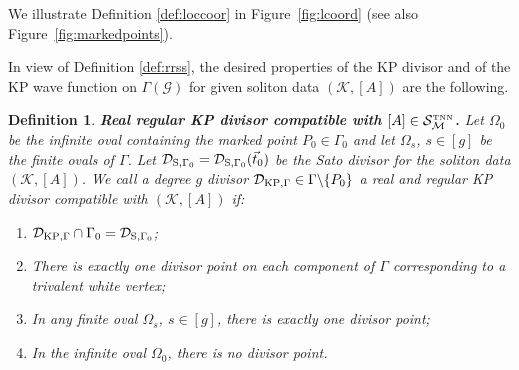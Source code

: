 \documentclass[11pt]{amsart}
\theoremstyle{plain}
\numberwithin{equation}{section}
\newtheorem{definition}{Definition}[subsection]
\def \DKP {{\mathcal D}_{\textup{\scriptsize KP},\Gamma}}
\def \DS {{\mathcal D}_{\textup{\scriptsize S},\Gamma_0}}
\begin{document}
We illustrate Definition \ref{def:loccoor} in Figure~\ref{fig:lcoord} (see also Figure~\ref{fig:markedpoints}).

In view of Definition \ref{def:rrss}, the desired properties of the KP divisor and of the KP wave function on $\Gamma(\mathcal G)$ for given soliton data $(\mathcal K, [A])$ are the following.

\begin{definition}\label{def:real_KP_div}\textbf{Real regular KP divisor compatible with $[A] \in {\mathcal S}_{\mathcal M}^{\mbox{\tiny TNN}}$.}  
Let $\Omega_0$ be the infinite oval containing the marked point $P_0\in\Gamma_0$ and let $\Omega_s$, $s\in[g]$ be the finite ovals of $\Gamma$. Let $\DS=\DS (\vec t_0)$ be the Sato divisor for the soliton data $(\mathcal K, [A])$.
We call a degree $g$ divisor $\DKP\in\Gamma\backslash \{ P_0\}$ a real and 
regular KP divisor compatible with $(\mathcal K, [A])$ if:
\begin{enumerate}
\item $\DKP\cap \Gamma_0 = \DS$; 
\item There is exactly one divisor point on each component of $\Gamma$ corresponding to a trivalent white vertex; 
\item\label{item:defodd_KP} In any finite oval $\Omega_s$, $s\in [g]$, there is exactly one divisor point;
\item\label{item:defeven_KP} In the infinite oval $\Omega_0$, there is no divisor point.
\end{enumerate}
\end{definition}
\end{document}

